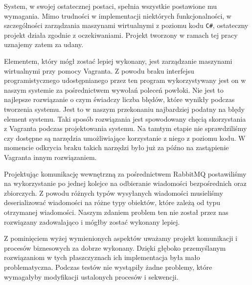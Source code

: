 \documentclass[../podsumowanie.tex]{subfiles}
\begin{document}
\label{final_system_form}

System, w swojej ostatecznej postaci, spełnia wszystkie postawione mu wymagania. Mimo trudności w implementacji niektórych funkcjonalności, w szczególności zarządzania maszynami wirtualnymi z poziomu kodu \texttt{C\#}, ostateczny projekt działa zgodnie z oczekiwaniami. Projekt tworzony w ramach tej pracy uznajemy zatem za udany.

Elementem, który mógł zostać lepiej wykonany, jest zarządzanie maszynami wirtualnymi przy pomocy Vagranta. Z powodu braku interfejsu programistycznego udostępnianego przez ten program wykorzystywany jest on w naszym systemie za pośrednictwem wywołań poleceń powłoki. Nie jest to najlepsze rozwiązanie o czym świadczy liczba błędów, które wynikły podczas tworzenia systemu. Jest to w naszym przekonaniu najbardziej podatny na błędy element systemu. Taki sposób rozwiązania jest spowodowany chęcią skorzystania z Vagranta podczas projektowania systemu. Na tamtym etapie nie sprawdziliśmy czy dostępne są narzędzia umożliwiające korzystanie z niego z poziomu kodu. W momencie odkrycia braku takich narzędzi było już za późno na zastąpienie Vagranta innym rozwiązaniem.

Projektując komunikację wewnętrzną za pośrednictwem RabbitMQ postawiliśmy na wykorzystanie po jednej kolejce na odbieranie wiadomości bezpośrednich oraz zbiorczych.
Z powodu różnych typów wysyłanych wiadomości musieliśmy deserializować wiadomości na różne typy obiektów, które zależą od typu otrzymanej wiadomości.
Naszym zdaniem problem ten nie został przez nas rozwiązany zadowalająco i mógłby zostać wykonany lepiej.

Z pominięciem wyżej wymienionych aspektów uważamy projekt komunikacji i procesów biznesowych za dobrze wykonany.
Dzięki głęboko przemyślanym rozwiązaniom w tych płaszczyznach ich implementacja była mało problematyczna.
Podczas testów nie wystąpiły żadne problemy, które wymagałyby modyfikacji ustalonych procesów i sekwencji.
\end{document}
